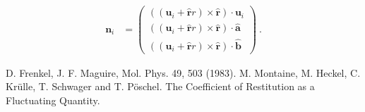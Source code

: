 \documentclass[aps,pre,onecolumn,preprint,showpacs]{revtex4}
\begin{document}
\begin{align}
\mathbf{n}_i   & = 
\begin{pmatrix}
   \left( (\mathbf{u}_i+ \hat{\mathbf{r}} r)\times \hat{\mathbf{r}}\right) \cdot \mathbf{u}_i \\
   \left( (\mathbf{u}_i+ \hat{\mathbf{r}} r)\times \hat{\mathbf{r}}\right) \cdot \hat{\mathbf{a}} \\
   \left( (\mathbf{u}_i+ \hat{\mathbf{r}} r)\times \hat{\mathbf{r}}\right) \cdot \hat{\mathbf{b}}
\end{pmatrix}~.
\end{align}

\begin{thebibliography}{}

  D. Frenkel, J. F. Maguire, Mol. Phys. 49, 503 (1983).
 M. Montaine, M. Heckel, C. Kr\"ulle, T. Schwager and T. P\"oschel. The
Coefficient of Restitution as a Fluctuating Quantity.

\end{thebibliography}
\end{document}
